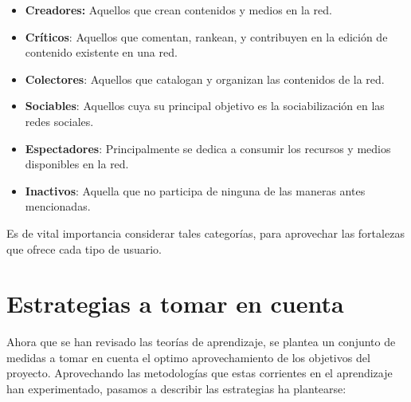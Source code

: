 \begin{itemize}
\item \textbf{Creadores:} Aquellos que crean contenidos y medios en la red.
\item \textbf{Críticos}: Aquellos que comentan, rankean, y contribuyen en la
      edición de contenido existente en una red.
\item \textbf{Colectores}: Aquellos que catalogan y organizan las contenidos de
      la red.
\item \textbf{Sociables}: Aquellos cuya su principal objetivo es la
      sociabilización en las redes sociales.
\item \textbf{Espectadores}: Principalmente se dedica a consumir los recursos y
      medios disponibles en la red.
\item \textbf{Inactivos}: Aquella que no participa de ninguna de las maneras
      antes mencionadas.
\end{itemize}

Es de vital importancia considerar tales categorías, para aprovechar las
fortalezas que ofrece cada tipo de usuario.

\section{Estrategias a tomar en cuenta}

Ahora que se han revisado las teorías de aprendizaje, se plantea un conjunto de
medidas a tomar en cuenta el optimo aprovechamiento de los objetivos del
proyecto. Aprovechando las metodologías que estas corrientes en el aprendizaje han experimentado, pasamos a describir las estrategias ha plantearse:

